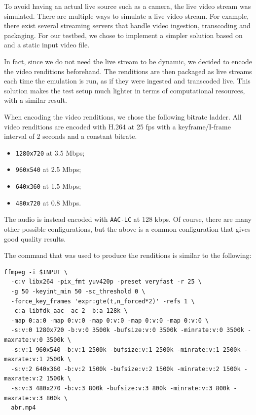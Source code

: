 To avoid having an actual live source such as a camera, the live video stream was simulated. There are multiple ways to simulate a live video stream. For example, there exist several streaming servers that handle video ingestion, transcoding and packaging. For our testbed, we chose to implement a simpler solution based on \ffmpeg{} and a static input video file.

In fact, since we do not need the live stream to be dynamic, we decided to encode the video renditions beforehand. The renditions are then packaged as live streams each time the emulation is run, as if they were ingested and transcoded live. This solution makes the test setup much lighter in terms of computational resources, with a similar result.

When encoding the video renditions, we chose the following bitrate ladder. All video renditions are encoded with H.264 at 25 fps with a keyframe/I-frame interval of 2 seconds and a constant bitrate.

\begin{itemize}
    \item \texttt{1280x720} at 3.5 Mbps;
    \item \texttt{960x540} at 2.5 Mbps;
    \item \texttt{640x360} at 1.5 Mbps;
    \item \texttt{480x720} at 0.8 Mbps.
\end{itemize}

The audio is instead encoded with \texttt{AAC-LC} at 128 kbps. Of course, there are many other possible configurations, but the above is a common configuration that gives good quality results.\cite{ozer}

The \ffmpeg{} command that was used to produce the renditions is similar to the following:

\begin{verbatim}
ffmpeg -i $INPUT \
  -c:v libx264 -pix_fmt yuv420p -preset veryfast -r 25 \
  -g 50 -keyint_min 50 -sc_threshold 0 \
  -force_key_frames 'expr:gte(t,n_forced*2)' -refs 1 \
  -c:a libfdk_aac -ac 2 -b:a 128k \
  -map 0:a:0 -map 0:v:0 -map 0:v:0 -map 0:v:0 -map 0:v:0 \
  -s:v:0 1280x720 -b:v:0 3500k -bufsize:v:0 3500k -minrate:v:0 3500k -maxrate:v:0 3500k \
  -s:v:1 960x540 -b:v:1 2500k -bufsize:v:1 2500k -minrate:v:1 2500k -maxrate:v:1 2500k \
  -s:v:2 640x360 -b:v:2 1500k -bufsize:v:2 1500k -minrate:v:2 1500k -maxrate:v:2 1500k \
  -s:v:3 480x270 -b:v:3 800k -bufsize:v:3 800k -minrate:v:3 800k -maxrate:v:3 800k \
  abr.mp4
\end{verbatim}

